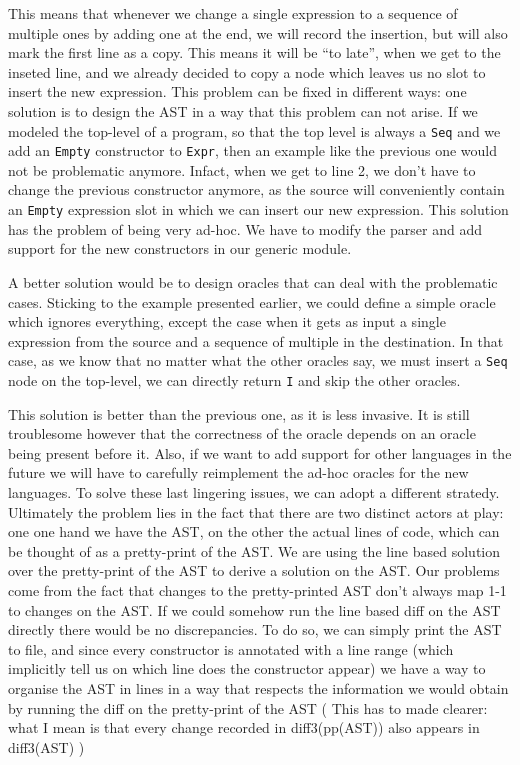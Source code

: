 \documentclass[11pt]{article}
\begin{document}
This means that whenever we change a single expression to a sequence of 
multiple ones by adding one at the end, we will record the insertion, but will 
also mark the first line as a copy. This means it will be ``to late'', when we 
get to the inseted line, and we already decided to copy a node which leaves us 
no slot to insert the new expression.
This problem can be fixed in different ways: one solution is to design the AST in a 
way that this problem can not arise. If we modeled the top-level of a program, 
so that the top level is always a \texttt{Seq} and we add an \texttt{Empty} 
constructor to \texttt{Expr}, then an example like the previous one would not be 
problematic anymore. Infact, when we get to line 2, we don't have to change the 
previous constructor anymore, as the source will conveniently contain an 
\texttt{Empty} expression slot in which we can insert our new expression.
This solution has the problem of being very ad-hoc. We have to modify the parser 
and add support for the new constructors in our generic module. 

A better solution would be to design oracles that can deal with the problematic cases. 
Sticking to the example presented earlier, we could define a simple oracle which 
ignores everything, except the case when it gets as input a single expression 
from the source and a sequence of multiple in the destination. In that case, as 
we know that no matter what the other oracles say, we must insert a \texttt{Seq} 
node on the top-level, we can directly return \texttt{I} and skip the other 
oracles. 

This solution is better than the previous one, as it is less invasive. It is 
still troublesome however that the correctness of the oracle depends on an 
oracle being present before it. Also, if we want to add support for other 
languages in the future we will have to carefully reimplement the ad-hoc oracles 
for the new languages. To solve these last lingering issues, we can adopt a 
different stratedy. Ultimately the problem lies in the fact that there are two 
distinct actors at play: one one hand we have the AST, on the other the actual lines of 
code, which can be thought of as a pretty-print of the AST. We are using the line based solution 
over the pretty-print of the AST to derive a solution on the AST. Our problems 
come from the fact that changes to the pretty-printed AST don't always map 1-1 
to changes on the AST. If we could somehow run the line based diff on the AST 
directly there would be no discrepancies. To do so, we can simply print the AST 
to file, and since every constructor is annotated with a line range (which implicitly tell us on which line does the constructor appear)
we have a way to organise the AST in lines in a way that respects the 
information we would obtain by running the diff on the pretty-print of the AST ( This has to made clearer: what 
I mean is that every change recorded in diff3(pp(AST)) also appears in diff3(AST) 
)
\end{document}
